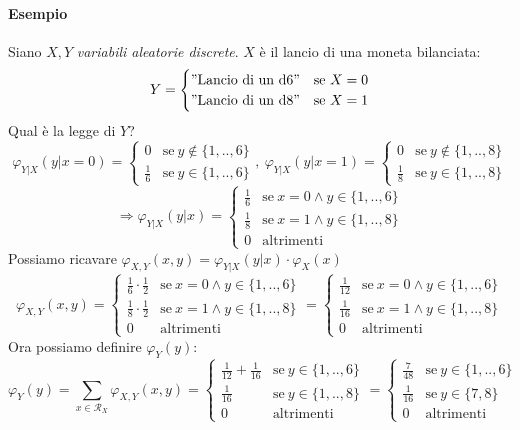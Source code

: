 \documentclass[12pt, a4paper]{report}
\theoremstyle{definition}
\DeclareRobustCommand{\supp}{\mathcal{R}}%
\begin{document}
\paragraph*{Esempio}
Siano $X,Y$ \emph{variabili aleatorie discrete}. $X$ è il lancio
di una moneta bilanciata:
\[Y=\begin{cases}
	"\text{Lancio di un d6}" & \text{se}\ {X=0}\\
	"\text{Lancio di un d8}" & \text{se}\ {X=1}
\end{cases}\]
Qual è la legge di $Y$?
\[\varphi_{Y|X}(y|x=0)=\begin{cases}
	{0} & \text{se}\ {y\notin\{1,..,6\}}\\
	{\frac{1}{6}} & \text{se}\ {y\in\{1,..,6\}}
\end{cases},\ \varphi_{Y|X}(y|x=1)=\begin{cases}
	{0} & \text{se}\ {y\notin\{1,..,8\}}\\
	{\frac{1}{8}} & \text{se}\ {y\in\{1,..,8\}}
\end{cases}\]
\[\Rightarrow\varphi_{Y|X}(y|x)=\begin{cases}
	{\frac{1}{6}} & \text{se}\ {x=0\wedge y\in\{1,..,6\}}\\
	{\frac{1}{8}} & \text{se}\ {x=1\wedge y\in\{1,..,8\}}\\
	{0} & \text{altrimenti}
\end{cases}\]
Possiamo ricavare \(\varphi_{X,Y}(x,y)=\varphi_{Y|X}(y|x)\cdot \varphi_X(x)\)
\[\varphi_{X,Y}(x,y)=\begin{cases}
	{\frac{1}{6}\cdot \frac{1}{2}} & \text{se}\ {x=0\wedge y\in\{1,..,6\}}\\
	{\frac{1}{8}\cdot \frac{1}{2}} & \text{se}\ {x=1\wedge y\in\{1,..,8\}}\\
	{0} & \text{altrimenti}
\end{cases}=\begin{cases}
	{\frac{1}{12}} & \text{se}\ {x=0\wedge y\in\{1,..,6\}}\\
	{\frac{1}{16}} & \text{se}\ {x=1\wedge y\in\{1,..,8\}}\\
	{0} & \text{altrimenti}
\end{cases}\]
Ora possiamo definire $\varphi_Y(y)$:
\[\varphi_Y(y)=\sum_{x\in\supp_X}\varphi_{X,Y}(x,y)=\begin{cases}
	{\frac{1}{12}+\frac{1}{16}} & \text{se}\ {y\in\{1,..,6\}}\\
	{\frac{1}{16}} & \text{se}\ {y\in\{1,..,8\}}\\
	{0} & \text{altrimenti}
\end{cases}=\begin{cases}
	{\frac{7}{48}} & \text{se}\ {y\in\{1,..,6\}}\\
	{\frac{1}{16}} & \text{se}\ {y\in\{7,8\}}\\
	{0} & \text{altrimenti}
\end{cases}\]
\end{document}

